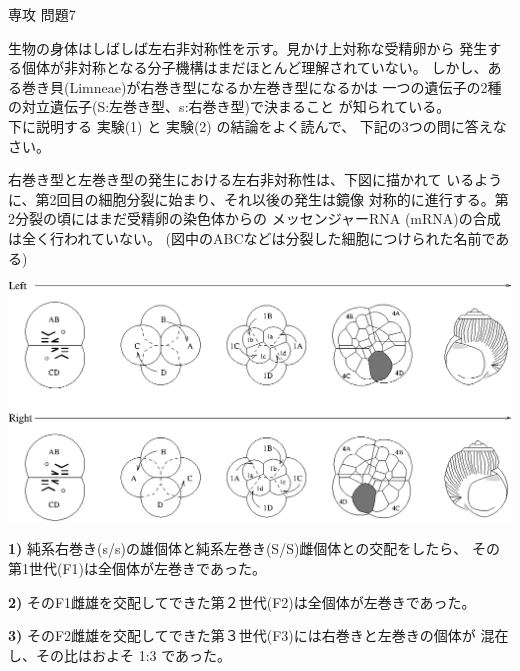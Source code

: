 \documentclass[fleqn]{jbook}
\begin{document}
\begin{question}{専攻 問題7}{}


生物の身体はしばしば左右非対称性を示す。見かけ上対称な受精卵から
発生する個体が非対称となる分子機構はまだほとんど理解されていない。
しかし、ある巻き貝(Limneae)が右巻き型になるか左巻き型になるかは
一つの遺伝子の2種の対立遺伝子(S:左巻き型、s:右巻き型)で決まること
が知られている。\\
下に説明する 実験(1) と 実験(2) の結論をよく読んで、
下記の3つの問に答えなさい。\\

\begin{list}{}{\itemindent=0mm \topsep=0mm}
\item[] 右巻き型と左巻き型の発生における左右非対称性は、下図に描かれて
        いるように、第2回目の細胞分裂に始まり、それ以後の発生は鏡像
        対称的に進行する。第2分裂の頃にはまだ受精卵の染色体からの
        メッセンジャーRNA (mRNA)の合成は全く行われていない。 
        (図中のABCなどは分裂した細胞につけられた名前である)
\end{list}

\begin{center}
\mbox{\includegraphics[clip]{1996phy7-1.eps}}
\end{center}

\begin{list}{}{\itemindent=0mm \topsep=0mm \itemsep=0mm \parsep=0mm}
\item[\bf 1)]
  純系右巻き(s/s)の雄個体と純系左巻き(S/S)雌個体との交配をしたら、
  その第1世代(F1)は全個体が左巻きであった。

\item[\bf 2)]
  そのF1雌雄を交配してできた第２世代(F2)は全個体が左巻きであった。

\item[\bf 3)]
  そのF2雌雄を交配してできた第３世代(F3)には右巻きと左巻きの個体が
  混在し、その比はおよそ 1:3 であった。
\end{list}



\end{question}
\end{document}
